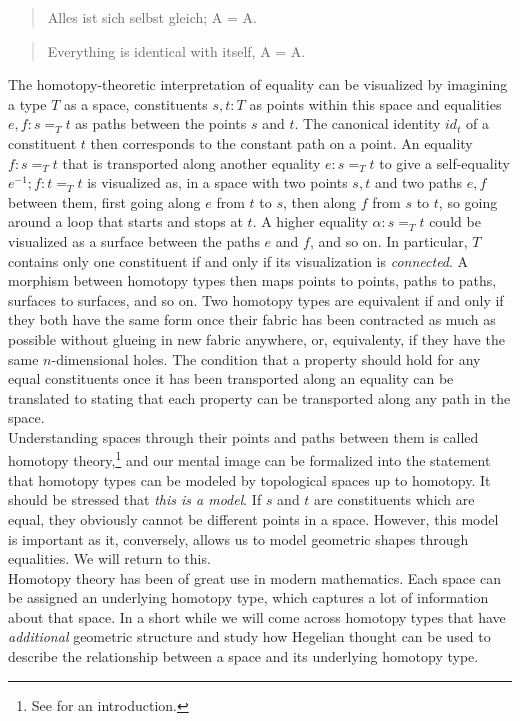 \documentclass{article}
\begin{document}
\begin{quote}
    Alles ist sich selbst gleich; A = A.
\end{quote}

\begin{quote}
    Everything is identical with itself, A = A.
\end{quote}

The homotopy-theoretic interpretation of equality can be visualized by imagining a type $T$ as a space,
constituents $s,t:T$ as points within this space and equalities $e,f:s=_T t$ as paths between the points
$s$ and $t$. The canonical identity $id_t$ of a constituent $t$ then corresponds to the constant path
on a point. An equality $f:s =_T t$  that is transported along another equality $e:s =_T t$ to give a
self-equality $e^{-1};f:t=_T t$ is visualized as, in a space with two points $s,t$ and two paths $e,f$
between them, first going along $e$ from $t$ to $s$, then along $f$ from $s$ to $t$, so going around a
loop that starts and stops at $t$. A higher equality $\alpha:s=_T t$ could be visualized as a surface
between the paths $e$ and $f$, and so on. In particular, $T$ contains only one constituent if and only
if its visualization is \emph{connected}. A morphism between homotopy types then maps points to points,
paths to paths, surfaces to surfaces, and so on. Two homotopy types are equivalent if and only if they
both have the same form once their fabric has been contracted as much as possible without glueing in new
fabric anywhere, or, equivalenty, if they have the same $n$-dimensional holes. The condition that a property
should hold for any equal constituents once it has been transported along an equality can be translated
to stating that each property can be transported along any path in the space. \\

Understanding spaces through their points and paths between them is called homotopy theory,\footnote{See
\cite{Htt} for an introduction.} and our mental image can be formalized into the statement that homotopy
types can be modeled by topological spaces up to homotopy. It should be stressed that \emph{this is a
model}. If $s$ and $t$ are constituents which are equal, they obviously cannot be different points in
a space. However, this model is important as it, conversely, allows us to model geometric shapes through
equalities. We will return to this. \\

Homotopy theory has been of great use in modern mathematics. Each space can be assigned an underlying
homotopy type, which captures a lot of information about that space. In a short while we will come across
homotopy types that have \emph{additional} geometric structure and study how Hegelian thought can be used
to describe the relationship between a space and its underlying homotopy type. \\
\end{document}
